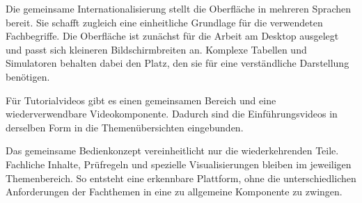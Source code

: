 Die gemeinsame Internationalisierung stellt die Oberfläche in mehreren Sprachen bereit.
Sie schafft zugleich eine einheitliche Grundlage für die verwendeten Fachbegriffe. Die
Oberfläche ist zunächst für die Arbeit am Desktop ausgelegt und passt sich kleineren
Bildschirmbreiten an. Komplexe Tabellen und Simulatoren behalten dabei den Platz, den sie
für eine verständliche Darstellung benötigen.

Für Tutorialvideos gibt es einen gemeinsamen Bereich und eine wiederverwendbare
Videokomponente. Dadurch sind die Einführungsvideos in derselben Form in die
Themenübersichten eingebunden.

Das gemeinsame Bedienkonzept vereinheitlicht nur die wiederkehrenden Teile. Fachliche
Inhalte, Prüfregeln und spezielle Visualisierungen bleiben im jeweiligen Themenbereich.
So entsteht eine erkennbare Plattform, ohne die unterschiedlichen Anforderungen der
Fachthemen in eine zu allgemeine Komponente zu zwingen.

